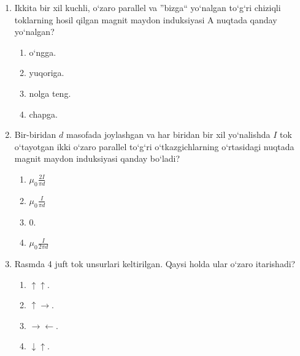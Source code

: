 \begin{enumerate}
\item Ikkita bir xil kuchli, o‘zaro parallel va ''bizga`` yo‘nalgan to‘g‘ri chiziqli toklarning hosil qilgan magnit maydon induksiyasi A nuqtada qanday yo‘nalgan?


\begin{enumerate}[label=\Alph*)]
\item o‘ngga.
\item yuqoriga.
\item nolga teng.
\item chapga.
\end{enumerate}

\item Bir-biridan $d$ masofada joylashgan va har biridan bir xil yo‘nalishda $I$ tok o‘tayotgan ikki o‘zaro parallel to‘g‘ri o‘tkazgichlarning o‘rtasidagi nuqtada magnit maydon induksiyasi qanday bo‘ladi?



\begin{enumerate}[label=\Alph*)]
\item $\mu_0 \frac{2I}{\pi d}$
\item $\mu_0 \frac{I}{\pi d}$
\item 0.
\item $\mu_0 \frac{I}{2\pi d}$
\end{enumerate}


\item Rasmda 4 juft tok unsurlari keltirilgan. Qaysi holda ular o‘zaro itarishadi?
\begin{enumerate}[label=\Alph*)]
\item $\uparrow \uparrow$.
\item $\uparrow \rightarrow$.
\item $\rightarrow \leftarrow$.
\item $\downarrow \uparrow$.
\end{enumerate}


\end{enumerate}
